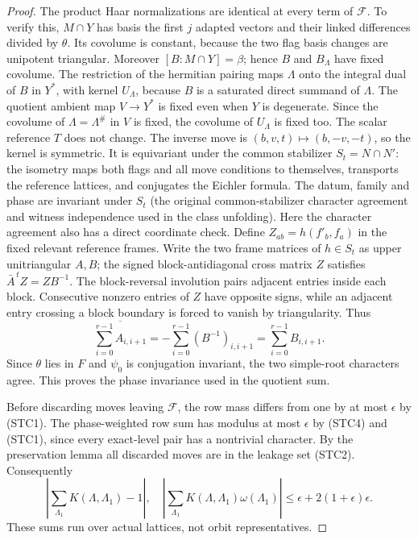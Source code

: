 \begin{proof}
The product Haar normalizations are identical at
every term of \(\mathcal F\). To verify this,
\(M\cap Y\) has basis the first \(j\) adapted
vectors and their linked differences divided by
\(\theta\). Its covolume is constant, because the
two flag basis changes are unipotent triangular.
Moreover \([B:M\cap Y]=\beta\); hence \(B\) and
\(B_\Lambda\) have fixed covolume. The restriction
of the hermitian pairing maps \(\Lambda\) onto
the integral dual of \(B\) in \(Y^*\), with kernel
\(U_\Lambda\), because \(B\) is a saturated direct
summand of \(\Lambda\). The quotient ambient map
\(V\to Y^*\) is fixed even when \(Y\) is degenerate.
Since the covolume of \(\Lambda=\Lambda^\#\) in \(V\)
is fixed, the covolume of \(U_\Lambda\) is fixed too.
The scalar reference \(T\) does not change.
The inverse move is \((b,v,t)\mapsto(b,-v,-t)\),
so the kernel is symmetric. It is equivariant
under the common stabilizer \(S_t=N\cap N'\):
the isometry maps both flags and all move conditions
to themselves, transports the reference lattices,
and conjugates the Eichler formula. The datum,
family and phase are invariant under \(S_t\)
(the original common-stabilizer character agreement
and witness independence used in the class unfolding).
Here the character agreement also has a direct coordinate
check. Define \(Z_{ab}=h(f'_b,f_a)\) in the fixed relevant
reference frames. Write the two frame matrices of \(h\in S_t\) as
upper unitriangular \(A,B\); the signed block-antidiagonal
cross matrix \(Z\) satisfies
\(\bar A^{\,t}Z=ZB^{-1}\).
The block-reversal involution pairs adjacent entries inside
each block. Consecutive nonzero entries of \(Z\) have
opposite signs, while an adjacent entry crossing a block
boundary is forced to vanish by triangularity. Thus
\[
 \overline{\sum_{i=0}^{r-1}A_{i,i+1}}
       =-\sum_{i=0}^{r-1}(B^{-1})_{i,i+1}
       =\sum_{i=0}^{r-1}B_{i,i+1}.
\]
Since \(\theta\) lies in \(F\) and \(\psi_0\) is
conjugation invariant, the two simple-root characters
agree. This proves the phase invariance used in the
quotient sum.

Before discarding moves leaving \(\mathcal F\),
the row mass differs from one by at most \(\epsilon\)
by (STC1). The phase-weighted row sum has modulus
at most \(\epsilon\) by (STC4) and (STC1), since every
exact-level pair has a nontrivial character.
By the preservation lemma all discarded moves
are in the leakage set (STC2). Consequently
\[
 \left|\sum_{\Lambda_1}K(\Lambda,\Lambda_1)-1\right|,
 \quad\left|\sum_{\Lambda_1}K(\Lambda,\Lambda_1)
                           \omega(\Lambda_1)\right|
       \le \epsilon+2(1+\epsilon)\epsilon .        \tag{STC9}
\]
These sums run over actual lattices, not orbit
representatives.


\end{proof}

